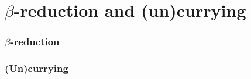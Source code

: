 \documentclass[main.tex]{subfiles}
\begin{document}
\section{$\beta$-reduction and (un)currying}
\label{betacurry}

\subsubsection{$\beta$-reduction}

\subsubsection{(Un)currying}
\end{document}
